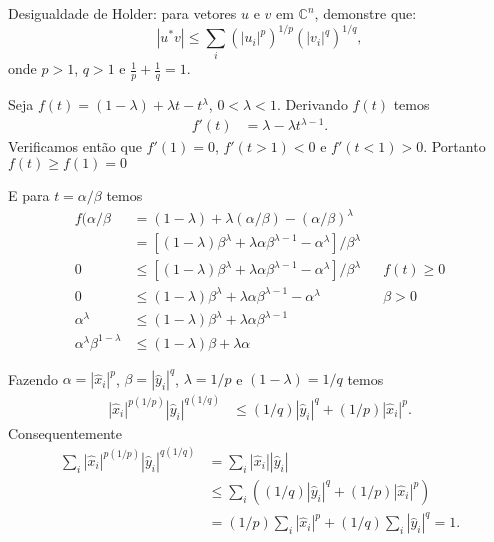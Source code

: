 \documentclass[a4paper,12pt, leqno, answers]{exam}
\begin{document}
\thispagestyle{empty}

\newpage
\setcounter{page}{1}
\begin{questions}
     Desigualdade de Holder: para vetores $u$ e $v$ em $\mathbb{C}^n$, demonstre que:
    \[
    | u^* v | \leq \sum_i \left( | u_i |^p \right)^{1/p} \left( | v_i |^q \right)^{1/q},
    \]
    onde $p > 1$, $q > 1$ e $\frac{1}{p} + \frac{1}{q} = 1$.
    \begin{solution}
        Seja $f(t) = \left( 1 - \lambda \right) + \lambda t - t^\lambda$, $0 < \lambda < 1$. Derivando $f(t)$ temos
        \begin{align*}
            f'(t) &= \lambda - \lambda t^{\lambda - 1}.
        \end{align*}
        Verificamos ent\~{a}o que $f'(1) = 0$, $f'(t > 1) < 0$ e $f'(t < 1) > 0$. Portanto $f(t) \geq f(1) = 0$ 

        E para $t = \alpha / \beta$ temos
        \begin{align*}
            f(\alpha / \beta &= \left( 1 - \lambda \right) + \lambda \left( \alpha / \beta \right) - \left( \alpha / \beta \right)^\lambda \\
            &= \left[ \left( 1 - \lambda \right) \beta^\lambda + \lambda \alpha \beta^{\lambda - 1} - \alpha^\lambda \right] / \beta^\lambda \\
            0 &\leq \left[ \left( 1 - \lambda \right) \beta^\lambda + \lambda \alpha \beta^{\lambda - 1} - \alpha^\lambda \right] / \beta^\lambda && f(t) \geq 0 \\
            0 &\leq \left( 1 - \lambda \right) \beta^\lambda + \lambda \alpha \beta^{\lambda - 1} - \alpha^\lambda && \beta > 0 \\
            \alpha^\lambda &\leq \left( 1 - \lambda \right) \beta^\lambda + \lambda \alpha \beta^{\lambda - 1} \\
            \alpha^\lambda \beta^{1 - \lambda} &\leq \left( 1 - \lambda \right) \beta + \lambda \alpha
        \end{align*}

        Fazendo $\alpha = | \hat{x}_i |^p$, $\beta = | \hat{y}_i |^q$, $\lambda = 1 / p$ e $(1 - \lambda) = 1 / q$ temos
        \begin{align*}
            | \hat{x}_i |^{p \left( 1 / p \right)} | \hat{y}_i |^{q \left( 1 / q \right)} &\leq \left( 1 / q \right) | \hat{y}_i |^q + \left( 1 / p \right) | \hat{x}_i |^p.
        \end{align*}
        Consequentemente
        \begin{align*}
            \sum_i | \hat{x}_i |^{p \left( 1 / p \right)} | \hat{y}_i |^{q \left( 1 / q \right)} &= \sum_i | \hat{x}_i | | \hat{y}_i | \\
            &\leq \sum_i \left( \left( 1 / q \right) | \hat{y}_i |^q + \left( 1 / p \right) | \hat{x}_i |^p \right) \\
            &= \left( 1 / p \right) \sum_i | \hat{x}_i |^p + \left( 1 / q \right) \sum_i | \hat{y}_i |^q = 1.
        \end{align*}


\end{solution}
\end{questions}
\end{document}
